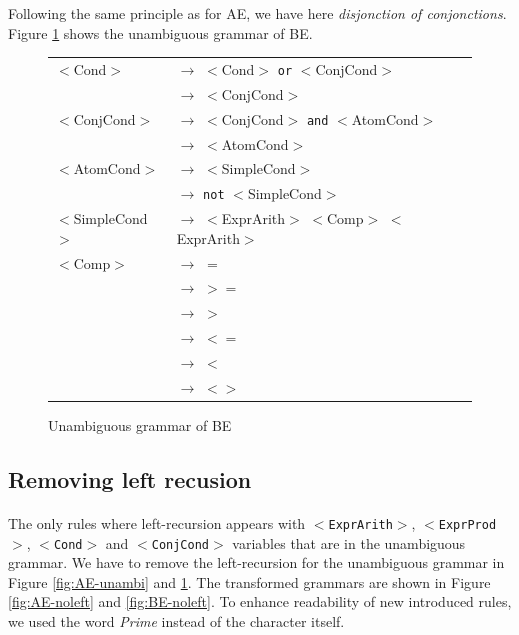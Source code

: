 \documentclass[letterpaper]{article}
\begin{document}
Following the same principle as for AE, we have here
\textit{disjonction of conjonctions}. Figure \ref{fig:BE-unambi}
shows the unambiguous grammar of BE.


\begin{figure}[H]
    \centering
    \begin{tabular}{l l}
        $<$Cond$>$ & $\rightarrow$ $<$Cond$>$ \texttt{or} $<$ConjCond$>$ \\
         & $\rightarrow$ $<$ConjCond$>$\\

        $<$ConjCond$>$ & $\rightarrow$
        $<$ConjCond$>$ \texttt{and} $<$AtomCond$>$\\
         & $\rightarrow$ $<$AtomCond$>$\\

        $<$AtomCond$>$ & $\rightarrow$ $<$SimpleCond$>$\\
         & $\rightarrow$ \texttt{not} $<$SimpleCond$>$\\

        $<$SimpleCond$>$ & $\rightarrow$
        $<$ExprArith$>$ $<$Comp$>$ $<$ExprArith$>$\\

        $<$Comp$>$ & $\rightarrow$ $=$\\
         & $\rightarrow$ $>=$\\
         & $\rightarrow$ $>$\\
         & $\rightarrow$ $<=$\\
         & $\rightarrow$ $<$\\
         & $\rightarrow$ $<>$\\
    \end{tabular}
    \caption{Unambiguous grammar of BE}
    \label{fig:BE-unambi}

\end{figure}


\subsection{Removing left recusion}
\paragraph{}

The only rules where left-recursion appears with \texttt{$<$ExprArith$>$},
\texttt{$<$ExprProd$>$}, \texttt{$<$Cond$>$} and \texttt{$<$ConjCond$>$}
variables
that are in the unambiguous grammar.
We have to remove the left-recursion for the unambiguous grammar
in Figure \ref{fig:AE-unambi} and \ref{fig:BE-unambi}. The transformed
grammars are shown in Figure \ref{fig:AE-noleft} and \ref{fig:BE-noleft}.
To enhance readability of new introduced rules,
we used the word \textit{Prime} instead of the character itself.
\end{document}
